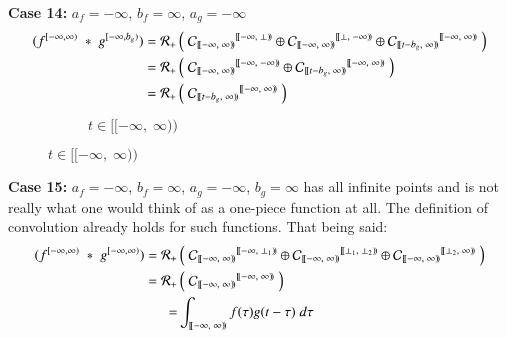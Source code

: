\textbf{Case 14:} $a_f=-\infty$, $b_f=\infty$, $a_g =-\infty$
\begin{align*}
	(f^{[-\infty,\infty)} \;*\; g^{[-\infty,b_g)})
	= \R[+] &\left( \; 
			{\C[ [\![-\infty,\;\infty)\!) ]}^{[\![-\infty,\; \bot)\!)} \oplus
			{\C[ [\![-\infty,\;\infty)\!) ]}^{[\![\bot,\; -\infty)\!)} \oplus
			{\C[ [\![t-b_g,\;\infty)\!) ]}^{[\![-\infty,\; \infty)\!)} 
		\; \right) \\
	= \R[+] &\left( \; 
			{\C[ [\![-\infty,\;\infty)\!) ]}^{[\![-\infty,\; -\infty)\!)} \oplus
			{\C[ [\![t-b_g,\;\infty)\!) ]}^{[\![-\infty,\; \infty)\!)} 
		\; \right) \\
	= \R[+] &\left( \; 
			{\C[ [\![t-b_g,\;\infty)\!) ]}^{[\![-\infty,\; \infty)\!)} 
		\; \right) 
\end{align*}
\vspace{-1.5cm}
\begin{figure}[h]
	\centering
	\begin{subfigure}[h]{0.4\textwidth}
		\caption{$t \in [\![-\infty, \; \infty)\!)$} 
		\centering
	\end{subfigure}
\end{figure}


\textbf{Case 15:} $a_f=-\infty$, $b_f=\infty$, $a_g =-\infty$, $b_g=\infty$
has all infinite points and is not really what one would think of as a one-piece function at all.
The definition of convolution already holds for such functions.
That being said:
\begin{align*}
	(f^{[-\infty,\infty)} \;*\; g^{[-\infty,\infty)})
	= \R[+] &\left( \; 
			{\C[ [\![-\infty,\;\infty)\!) ]}^{[\![-\infty,\; \bot_1)\!)} \oplus
			{\C[ [\![-\infty,\;\infty)\!) ]}^{[\![\bot_1,\;\bot_2)\!)} \oplus
			{\C[ [\![-\infty,\;\infty)\!) ]}^{[\![\bot_2,\; \infty)\!)} 
		\; \right) \\
	= \R[+] &\left( \; 
			{\C[ [\![-\infty,\;\infty)\!) ]}^{[\![-\infty,\; \infty)\!)} 
		\; \right) \\
	= & \int_{[\![ -\infty, \; \infty )\!)} f(\tau)g(t-\tau) \; d\tau
\end{align*}


